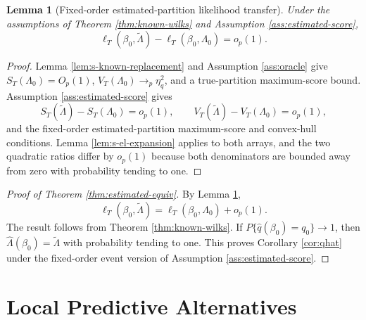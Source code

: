 \documentclass[10pt]{book}
\numberwithin{equation}{section}
\newtheorem{lemma}{Lemma}
\theoremstyle{definition}
\begin{document}
\begin{lemma}[Fixed-order estimated-partition likelihood transfer]
\label{lem:s-estimated-transfer}
Under the assumptions of Theorem \ref*{thm:known-wilks} and Assumption \ref*{ass:estimated-score},
\[
    \ell_T(\beta_0,\widetilde\Lambda)
    -
    \ell_T(\beta_0,\Lambda_0)
    =o_p(1).
\]
\end{lemma}

\begin{proof}
Lemma \ref{lem:s-known-replacement} and Assumption \ref*{ass:oracle} give \(S_T(\Lambda_0)=O_p(1)\), \(V_T(\Lambda_0)\to_p\eta_q^2\), and a true-partition maximum-score bound. Assumption \ref*{ass:estimated-score} gives
\[
    S_T(\widetilde\Lambda)-S_T(\Lambda_0)=o_p(1),
    \qquad
    V_T(\widetilde\Lambda)-V_T(\Lambda_0)=o_p(1),
\]
and the fixed-order estimated-partition maximum-score and convex-hull conditions. Lemma \ref{lem:s-el-expansion} applies to both arrays, and the two quadratic ratios differ by \(o_p(1)\) because both denominators are bounded away from zero with probability tending to one.
\end{proof}

\begin{proof}[Proof of Theorem \ref*{thm:estimated-equiv}]
By Lemma \ref{lem:s-estimated-transfer},
\[
    \ell_T(\beta_0,\widetilde\Lambda)
    =
    \ell_T(\beta_0,\Lambda_0)+o_p(1).
\]
The result follows from Theorem \ref*{thm:known-wilks}. If \(P\{\widehat q(\beta_0)=q_0\}\to1\), then \(\widehat\Lambda(\beta_0)=\widetilde\Lambda\) with probability tending to one. This proves Corollary \ref*{cor:qhat} under the fixed-order event version of Assumption \ref*{ass:estimated-score}.
\end{proof}
\section{Local Predictive Alternatives}
\end{document}
